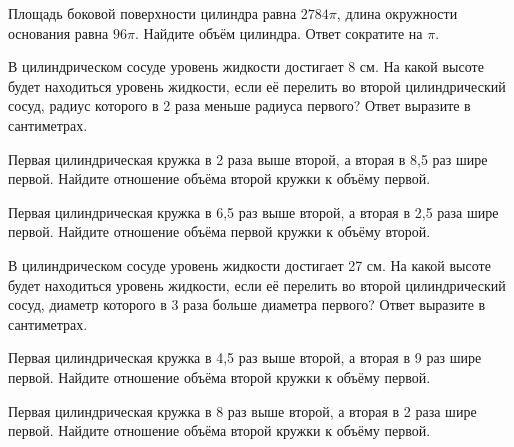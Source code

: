 \documentclass[4apaper]{article}
\begin{document}
\begin{taskBN}{50}
Площадь боковой поверхности цилиндра равна $2784\pi$, длина окружности основания равна $96\pi$. Найдите объём цилиндра. Ответ сократите на $\pi$.
\end{taskBN}

\begin{taskBN}{51}
В цилиндрическом сосуде уровень жидкости достигает 8 см. На какой высоте будет находиться уровень жидкости, если её перелить во второй цилиндрический сосуд, радиус которого в 2 раза меньше радиуса первого? Ответ выразите в сантиметрах.
\end{taskBN}

\begin{taskBN}{52}
 Первая цилиндрическая кружка в 2 раза выше второй, а вторая в 8,5 раз шире первой. Найдите отношение объёма второй кружки к объёму первой.
\end{taskBN}

\begin{taskBN}{53}
 Первая цилиндрическая кружка в 6,5 раз выше второй, а вторая в 2,5 раза шире первой. Найдите отношение объёма первой кружки к объёму второй.
\end{taskBN}

\begin{taskBN}{54}
В цилиндрическом сосуде уровень жидкости достигает 27 см. На какой высоте будет находиться уровень жидкости, если её перелить во второй цилиндрический сосуд, диаметр которого в 3 раза больше диаметра первого? Ответ выразите в сантиметрах.
\end{taskBN}

\begin{taskBN}{55}
 Первая цилиндрическая кружка в 4,5 раз выше второй, а вторая в 9 раз шире первой. Найдите отношение объёма второй кружки к объёму первой.
\end{taskBN}

\begin{taskBN}{56}
 Первая цилиндрическая кружка в 8 раз выше второй, а вторая в 2 раза шире первой. Найдите отношение объёма второй кружки к объёму первой.
\end{taskBN}
\end{document}
